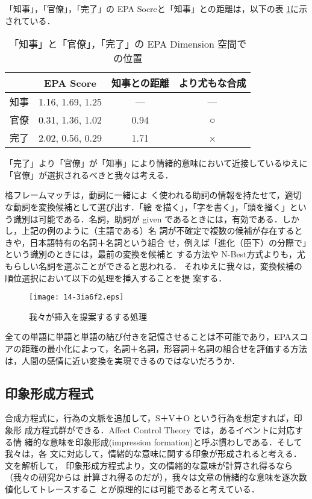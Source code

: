 \documentclass[japanese]{jnlp_1.3d}
\begin{document}
「知事」，「官僚」，「完了」の EPA Socreと「知事」との距離は，以下の表
\ref{key:tableEPAof3words}に示されている．

\begin{table}[b]
\caption{「知事」と「官僚」，「完了」の EPA Dimension 空間での位置} \label{key:tableEPAof3words}
\begin{center}
 \begin{tabular}{|c|c|c|c|} \hline
        & EPA Score & 知事との距離 & より尤もな合成 \\ \hline
   知事 & 1.16, 1.69, 1.25 & — & —\\ \hline
   官僚 & 0.31, 1.36, 1.02 & 0.94 & ○\\
   完了 & 2.02, 0.56, 0.29 & 1.71 & ×\\ \hline
 \end{tabular} 
\end{center}
\end{table}

「完了」より「官僚」が「知事」により情緒的意味において近接しているゆえに
「官僚」が選択されるべきと我々は考える．

格フレームマッチは，動詞に一緒によ
く使われる助詞の情報を持たせて，適切な動詞を変換候補として選び出す．「絵
を描く」，「字を書く」，「頭を掻く」という識別は可能である．名詞，助詞が
given であるときには，有効である．しかし，上記の例のように（主語である）名
詞が不確定で複数の候補が存在するときや，日本語特有の名詞＋名詞という組合
せ，例えば「進化（臣下）の分際で」という識別のときには，最前の変換を候補と
する方法や N-Best方式よりも，尤もらしい名詞を選ぶことができると思われる．
それゆえに我々は，変換候補の順位選択において以下の処理を挿入することを提
案する．

\begin{figure}[t]
 \begin{center} 
     \texttt{[image: 14-3ia6f2.eps]}
 \end{center}
 \caption{我々が挿入を提案するする処理} \label{KanaKnajiAlgo}
\end{figure}

全ての単語に単語と単語の結び付きを記憶させることは不可能であり，EPAスコ
アの距離の最小化によって，名詞＋名詞，形容詞＋名詞の組合せを評価する方法は，人間の感情に近い変換を実現できるのではないだろうか．



\subsection{印象形成方程式}
合成方程式に，行為の文脈を追加して，S＋V＋O という行為を想定すれば，印象形
成方程式群ができる．Affect Control Theory では，あるイベントに対応する情
緒的な意味を印象形成(impression formation)と呼ぶ慣わしである．そして我々は，各
文に対応して，情緒的な意味に関する印象が形成されると考える．文を解析して，
印象形成方程式より，文の情緒的な意味が計算され得るなら（我々の研究からは
計算され得るのだが），我々は文章の情緒的な意味を逐次数値化してトレースするこ
とが原理的には可能であると考えている．
\end{document}
